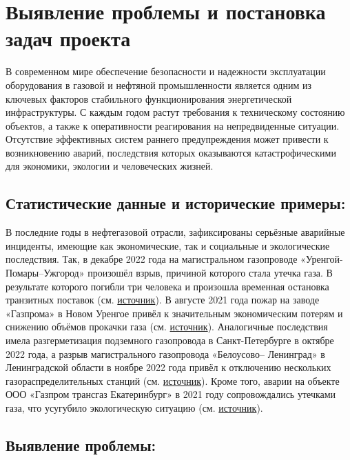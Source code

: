 \documentclass[a4paper,12pt]{article}
\begin{document}
\section{Выявление проблемы и постановка задач проекта}
\begin{flushleft}
В современном мире обеспечение безопасности и надежности эксплуатации оборудования в газовой и
нефтяной промышленности является одним из ключевых факторов стабильного функционирования энергетической инфраструктуры.
С каждым годом растут требования к техническому состоянию объектов, а также к оперативности реагирования на непредвиденные ситуации.
Отсутствие эффективных систем раннего предупреждения может привести к возникновению аварий,
последствия которых оказываются катастрофическими для экономики, экологии и человеческих жизней.

\subsection{Статистические данные и исторические примеры: }
В последние годы в нефтегазовой отрасли, зафиксированы серьёзные аварийные инциденты,
имеющие как экономические, так и социальные и экологические последствия.
Так, в декабре 2022 года на магистральном газопроводе «Уренгой-Помары–Ужгород» произошёл взрыв, причиной которого стала утечка газа.
В результате которого погибли три человека и произошла временная остановка транзитных поставок
(см. \href{https://oilcapital.ru/news/2022-12-23/gazoprovody-pod-udarom-2623441}{источник}).
В августе 2021 года пожар на заводе «Газпрома» в Новом Уренгое привёл к значительным экономическим потерям
и снижению объёмов прокачки газа (см. \href{https://www.rbc.ru/business/06/08/2021/610d06959a7947180b906801}{источник}).
Аналогичные последствия имела разгерметизация подземного газопровода в Санкт-Петербурге в октябре 2022 года,
а разрыв магистрального газопровода «Белоусово– Ленинград» в Ленинградской области в ноябре 2022 года привёл
к отключению нескольких газораспределительных станций
(см. \href{https://oilcapital.ru/news/2022-12-23/gazoprovody-pod-udarom-2623441}{источник}).
Кроме того, аварии на объекте ООО «Газпром трансгаз Екатеринбург» в 2021 году сопровождались утечками газа,
что усугубило экологическую ситуацию
(см. \href{https://www.gazprom.ru/f/posts/57/982072/gazprom-environmental-report-2021-ru.pdf}{источник}).

\subsection{Выявление проблемы: }


\end{flushleft}
\end{document}
